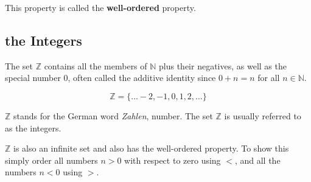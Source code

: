 \documentclass[11pt, oneside]{article}
\begin{document}
This property is called the \textbf{well-ordered} property.

\subsection*{the Integers}

The set $\mathbb{Z}$ contains all the members of $\mathbb{N}$ plus their negatives, as well as the special number $0$, often called the additive identity since $0 + n = n$ for all $n \in \mathbb{N}$.

\[ \mathbb{Z} = \{ \dots -2, -1, 0, 1, 2, \dots \} \]

$\mathbb{Z}$ stands for the German word \emph{Zahlen}, number.  The set $\mathbb{Z}$ is usually referred to as the integers.

$\mathbb{Z}$ is also an infinite set and also has the well-ordered property.  To show this simply order all numbers $n > 0$ with respect to zero using $<$, and all the numbers $n < 0$ using $>$.
\end{document}
